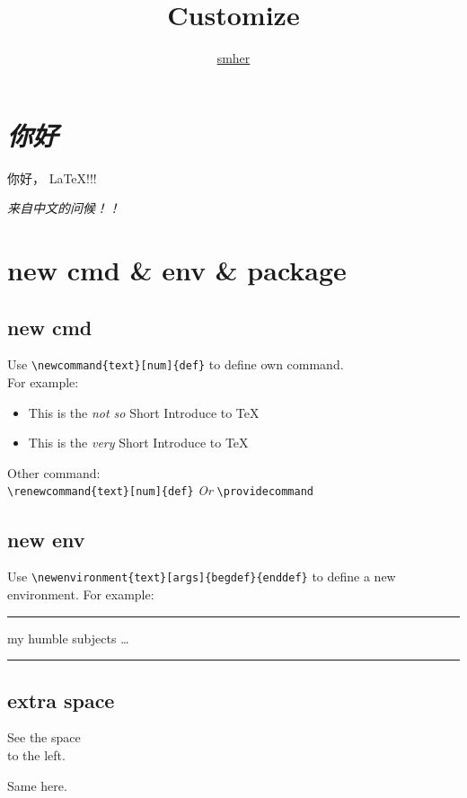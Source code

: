\documentclass[a4paper,12pt,titlepage]{article}
\title{Customize}
\author{\href{smhhaoo@126.com}{smher}}
\begin{document}
\maketitle
\tableofcontents

\newpage
\section{\textit{你好}}
你好， \LaTeX !!!\\
{\par \Huge \textit{来自中文的问候！！} }
\section{new cmd \& env \& package}
\subsection{new cmd}
Use \verb|\newcommand{text}[num]{def}| to define own command.\\
For example:\\
\newcommand{\owncmd}[1]{This is the \emph{#1} Short 
					Introduce to \TeX}
\begin{itemize}
\item \owncmd{not so}
\item \owncmd{very}
\end{itemize}

Other command:\\
\verb|\renewcommand{text}[num]{def}| \emph{Or} \verb|\providecommand|

\subsection{new env}
Use \verb|\newenvironment{text}[args]{begdef}{enddef}| to define a new environment.
For example: \\
\newenvironment{king}{\rule{1ex}{1ex} %
						\hspace{\stretch{1}}}{ %
						\rule{1ex}{1ex}}

\begin{king}
my humble subjects \ldots
\end{king}

\subsection{extra space}
\newenvironment{simple}{\noindent}{\par\noindent}
\begin{simple}
See the space \\ to the left.
\end{simple}
Same here.
\end{document}
